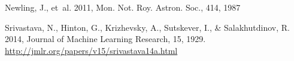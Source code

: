 \documentclass[twocolumn]{aastex61}
\begin{document}
\begin{thebibliography}{}
Newling, J., {et~al.} 2011, Mon. Not. Roy. Astron. Soc., 414, 1987

Srivastava, N., Hinton, G., Krizhevsky, A., Sutskever, I., \& Salakhutdinov, R.
  2014, Journal of Machine Learning Research, 15, 1929.
\newblock \url{http://jmlr.org/papers/v15/srivastava14a.html}

\end{thebibliography}
\end{document}
